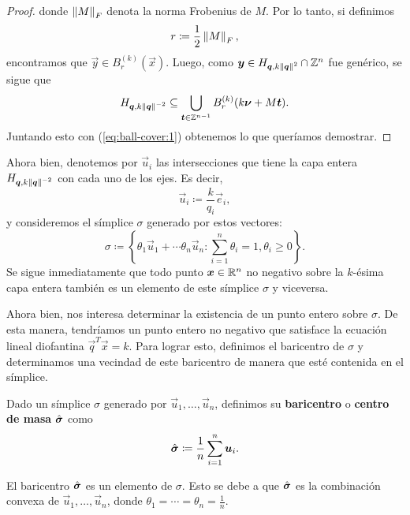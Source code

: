 \begin{proof}
	donde $\left\lVert M \right\rVert_F$ denota la norma Frobenius de $M$. Por lo tanto, si definimos
	\begin{equation}
		\label{eq:radius}
		r \coloneq \frac{1}{2}\left\lVert M \right\rVert_F,
	\end{equation}
	encontramos que $\vec{y} \in B_r^{(k)}(\vec{x})$. Luego, como $\boldsymbol{y} \in H_{\boldsymbol{q},
	k\left\lVert \boldsymbol{q} \right\rVert^2} \cap \mathbb{Z}^n$ fue genérico, se sigue que
	\begin{equation}
		\label{eq:ball-cover:2}
		H_{\boldsymbol{q}, k\left\lVert \boldsymbol{q} \right\rVert^{-2}} \subseteq
		\bigcup_{\boldsymbol{t} \in \mathbb{Z}^{n-1}}B_r^{(k)}(k\boldsymbol{\nu} + M\boldsymbol{t}).
	\end{equation}
	Juntando esto con (\ref{eq:ball-cover:1}) obtenemos lo que queríamos demostrar.
\end{proof}

Ahora bien, denotemos por $\vec{u}_i$ las intersecciones que tiene la capa entera $H_{\boldsymbol{q},
k\left\lVert \boldsymbol{q} \right\rVert^{-2}}$ con cada uno de los ejes. Es decir,
\begin{equation}
	\label{eq:generators}
	\vec{u}_i \coloneq \frac{k}{q_i}\vec{e}_i,
\end{equation}
y consideremos el símplice $\sigma$ generado por estos vectores:
\begin{equation*}
	\sigma \coloneq \left\lbrace \theta_1\vec{u}_1 + \cdots \theta_n\vec{u}_n \colon
		\sum_{i=1}^{n}\theta_i = 1, \theta_i \geq 0 \right\rbrace.
\end{equation*}
Se sigue inmediatamente que todo punto $\boldsymbol{x} \in \mathbb{R}^n$ no negativo sobre la $k$-ésima capa entera
también es un elemento de este símplice $\sigma$ y viceversa.

Ahora bien, nos interesa determinar la existencia de un punto entero sobre $\sigma$. De esta manera,
tendríamos un punto entero no negativo que satisface la ecuación lineal diofantina
$\vec{q}^T\vec{x} = k$. Para lograr esto, definimos el baricentro de $\sigma$ y determinamos una
vecindad de este baricentro de manera que esté contenida en el símplice.

\begin{definition}
	Dado un símplice $\sigma$ generado por $\vec{u}_1, \ldots, \vec{u}_n$, definimos su
	\textbf{baricentro} o \textbf{centro de masa} $\hat{\boldsymbol{ \sigma }}$ como
	\begin{equation*}
		\hat{\boldsymbol{ \sigma }} \coloneq \frac{1}{n} \sum_{i=1}^{n}\boldsymbol{u}_i.
	\end{equation*}
\end{definition}
\begin{observation}
	El baricentro $\hat{\boldsymbol{ \sigma }}$ es un elemento de $\sigma$. Esto se debe a que $\hat{\boldsymbol{ \sigma }}$ es la
	combinación convexa de $\vec{u}_1, \ldots, \vec{u}_n$, donde $\theta_1 = \cdots = \theta_n =
	\frac{1}{n}$.
\end{observation}

